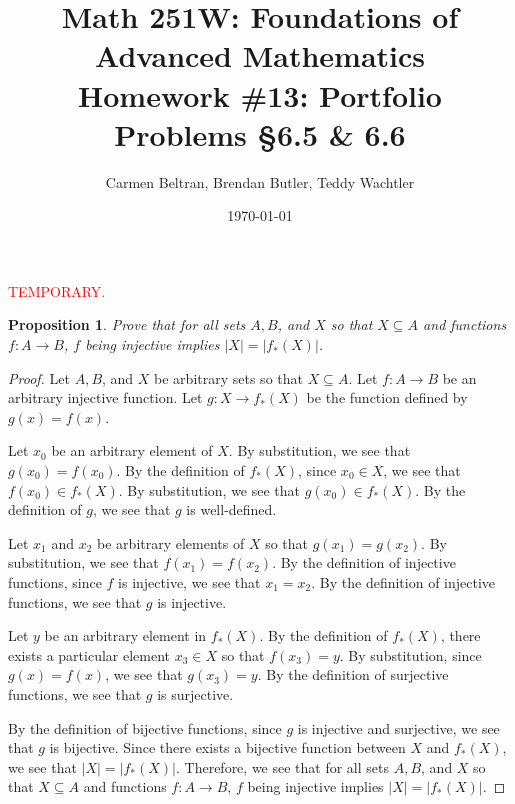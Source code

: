 \documentclass{amsart}
\newtheorem*{proposition}{Proposition}
\newcommand{\temp}{\textcolor{red}{TEMPORARY.} }
\newcommand{\img}{_{*}}
\newcommand{\abs}[1]{\left|#1\right|}
\numberwithin{equation}{section}
\begin{document}
	\title[Math 251W: Homework \#13]{
		Math 251W: Foundations of Advanced Mathematics \\
		\textmd{Homework \#13: Portfolio Problems \S 6.5 \& 6.6}}
	\author{Carmen Beltran, Brendan Butler, Teddy Wachtler}
	\date{\today}

	\maketitle

	\begin{problem}[manual-num=65]
		\temp
		\begin{proposition}
			Prove that for all sets $A, B$, and $X$ so that $X \subseteq A$ and functions $f : A \rightarrow B$, $f$ being injective implies $|X| = |f \img (X)|$.
		\end{proposition}

		\begin{proof}
			Let $A, B$, and $X$ be arbitrary sets so that $X \subseteq A$.
			Let $f : A \rightarrow B$ be an arbitrary injective function.
			Let $g : X \rightarrow f \img (X)$ be the function defined by $g(x) = f(x)$.

			Let $x_0$ be an arbitrary element of $X$.
			By substitution, we see that $g(x_0) = f(x_0)$.
			By the definition of $f \img (X)$, since $x_0 \in X$, we see that $f(x_0) \in f \img (X)$.
			By substitution, we see that $g(x_0) \in f \img (X)$.
			By the definition of $g$, we see that $g$ is well-defined.

			Let $x_1$ and $x_2$ be arbitrary elements of $X$ so that $g(x_1) = g(x_2)$.
			By substitution, we see that $f(x_1) = f(x_2)$.
			By the definition of injective functions, since $f$ is injective, we see that $x_1 = x_2$.
			By the definition of injective functions, we see that $g$ is injective.

			Let $y$ be an arbitrary element in $f \img (X)$.
			By the definition of $f \img (X)$, there exists a particular element $x_3 \in X$ so that $f(x_3) = y$.
			By substitution, since $g(x) = f(x)$, we see that $g(x_3) = y$.
			By the definition of surjective functions, we see that $g$ is surjective.

			By the definition of bijective functions, since $g$ is injective and surjective, we see that $g$ is bijective.
			Since there exists a bijective function between $X$ and $f \img (X)$, we see that $\abs{X} = \abs{f \img (X)}$.
			Therefore, we see that for all sets $A, B$, and $X$ so that $X \subseteq A$ and functions $f : A \rightarrow B$, $f$ being injective implies $|X| = |f \img (X)|$.
		\end{proof}
	\end{problem}
\end{document}
